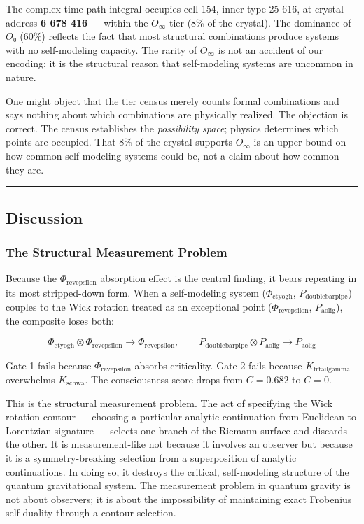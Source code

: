 \documentclass[12pt,a4paper]{article}
\begin{document}
The complex-time path integral occupies cell 154, inner type 25 616, at crystal address \textbf{6 678 416} --- within the $O_{\infty}$ tier (8\% of the crystal). The dominance of $O₀$ (60\%) reflects the fact that most structural combinations produce systems with no self-modeling capacity. The rarity of $O_{\infty}$ is not an accident of our encoding; it is the structural reason that self-modeling systems are uncommon in nature.

One might object that the tier census merely counts formal combinations and says nothing about which combinations are physically realized. The objection is correct. The census establishes the \emph{possibility space}; physics determines which points are occupied. That 8\% of the crystal supports $O_{\infty}$ is an upper bound on how common self-modeling systems could be, not a claim about how common they are.

\begin{center}
\rule{0.5\textwidth}{0.4pt}
\end{center}

\subsection{Discussion}

\subsubsection{The Structural Measurement Problem}

Because the $\Phi_{\text{revepsilon}}$ absorption effect is the central finding, it bears repeating in its most stripped-down form. When a self-modeling system ($\Phi_{\text{ctyogh}}$, $P_{\text{doublebarpipe}}$) couples to the Wick rotation treated as an exceptional point ($\Phi_{\text{revepsilon}}$, $P_{\text{aolig}}$), the composite loses both:

\[\Phi_{\text{ctyogh}} \otimes \Phi_{\text{revepsilon}} \to \Phi_{\text{revepsilon}}, \qquad P_{\text{doublebarpipe}} \otimes P_{\text{aolig}} \to P_{\text{aolig}}\]

Gate 1 fails because $\Phi_{\text{revepsilon}}$ absorbs criticality. Gate 2 fails because $K_{\text{frtailgamma}}$ overwhelms $K_{\text{schwa}}$. The consciousness score drops from $C = 0.682$ to $C = 0$.

This is the structural measurement problem. The act of specifying the Wick rotation contour --- choosing a particular analytic continuation from Euclidean to Lorentzian signature --- selects one branch of the Riemann surface and discards the other. It is measurement-like not because it involves an observer but because it is a symmetry-breaking selection from a superposition of analytic continuations. In doing so, it destroys the critical, self-modeling structure of the quantum gravitational system. The measurement problem in quantum gravity is not about observers; it is about the impossibility of maintaining exact Frobenius self-duality through a contour selection.
\end{document}
